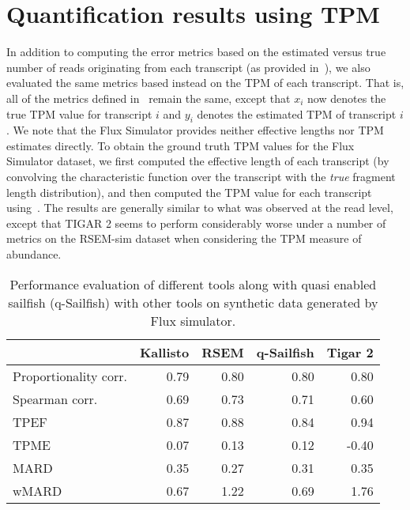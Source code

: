 \section{Quantification results using TPM}
\label{subsec:tpm_quant}

In addition to computing the error metrics based on the estimated versus true number of reads originating from each transcript (as provided in~), we also evaluated the same metrics based instead on the TPM of each transcript.  That is, all of the metrics defined in~ remain the same, except that $x_i$ now denotes the true TPM value for transcript $i$ and $y_i$ denotes the estimated TPM of transcript $i$.  We note that the Flux Simulator provides neither effective lengths nor TPM estimates directly.  To obtain the ground truth TPM values for the Flux Simulator dataset, we first computed the effective length of each transcript (by convolving the characteristic function over the transcript with the \textit{true} fragment length distribution), and then computed the TPM value for each transcript using~.  The results are generally similar to what was observed at the read level, except that TIGAR 2 seems to perform considerably worse under a number of metrics on the RSEM-sim dataset when considering the TPM measure of abundance. 

\begin{table*}[hbtp]
\centering
\caption{Performance evaluation of different tools along with quasi enabled sailfish (q-Sailfish) with other tools on synthetic data generated by Flux simulator.}
\label{tab:quant_perf_tpm_flux}
\begin{tabulary}{2cm}{lrrrr}
\toprule	
{} &  Kallisto &  RSEM &  q-Sailfish &  Tigar 2 \\
\midrule
Proportionality corr. &      0.79 &          0.80 &              0.80 &   0.80\\
Spearman corr.        &      0.69 &          0.73 &              0.71 &   0.60\\
TPEF 		      &      0.87 &          0.88 &              0.84 &   0.94\\
TPME 		      &      0.07 &          0.13 &              0.12 &  -0.40\\
MARD    	      &      0.35 &          0.27 &              0.31 &   0.35\\
wMARD 		      &      0.67 &          1.22 &              0.69 &   1.76\\
\bottomrule
\end{tabulary}
\end{table*}

